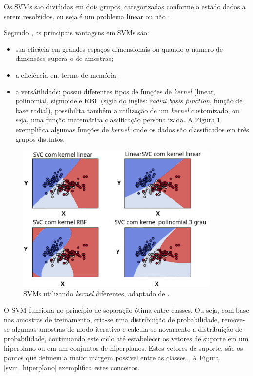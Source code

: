 Os SVMs são divididas em dois grupos, categorizadas conforme o estado dados a serem resolvidos, ou seja é um problema linear ou não \cite{lorena2007introduccao}.

Segundo , as principais vantagens em SVMs são:

\begin{itemize}
    \item sua eficácia em grandes espaços dimensionais ou quando o numero de dimensões supera o de amostras;
    \item a eficiência em termo de memória;
    \item a versátilidade: possui diferentes tipos de funções de \textit{kernel} (linear, polinomial, sigmoide e RBF (sigla do inglês: \textit{radial basis function}, função de base radial), possibilita também a utilização de um \textit{kernel} customizado, ou seja, uma função matemática classificação personalizada. A Figura \ref{svmkernel} exemplifica algumas funções de \textit{kernel}, onde os dados são classificados em três grupos distintos.
\end{itemize}

\begin{figure}[!htb]
    \centering
     \includegraphics[width=0.9\textwidth]{figuras/svmkernel.eps}
     \caption{SVMs utilizando \textit{kernel} diferentes, adaptado de .}
     \label{svmkernel}
 \end{figure}

 O SVM funciona no princípio de separação ótima entre classes. Ou seja, com base nas amostras de treinamento, cria-se uma distribuição de probabilidade, remove-se algumas amostras de modo iterativo e calcula-se novamente a distribuição de probabilidade, continuando este ciclo até estabelecer os vetores de suporte em um hiperplano ou em um conjuntos de hiperplanos. Estes vetores de suporte, são os pontos que definem a maior margem possível entre as classes \cite{huang2002assessment}. A Figura \ref{svm_hiperplano} exemplifica estes conceitos.

